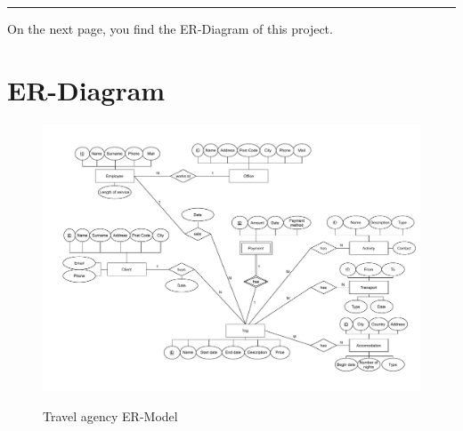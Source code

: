 \documentclass{article}
\begin{document}
	\hrule
	\vspace{2 cm}
	On the next page, you find the ER-Diagram of this project. 
	
	
	\newpage
	
	\section*{ER-Diagram}
	\begin{figure}[htbp]
		\centering
			\includegraphics[width=1.15\textwidth, angle=90]{../Proposition 2.pdf}
		\label{ER-Model}
		\caption{Travel agency ER-Model}
	\end{figure}
	
\end{document}
